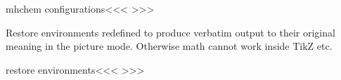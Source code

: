 \<mhchem configurations\><<<
>>>

Restore environments redefined to produce verbatim output to their
original meaning in the picture mode. Otherwise math cannot work
inside TikZ etc.

\<restore environments\><<<
>>>

\endinput
